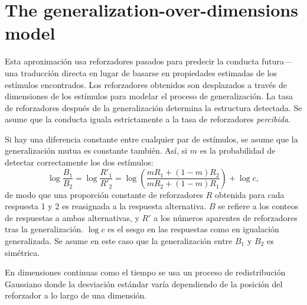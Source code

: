 \documentclass[a4paper,12pt]{article}
\begin{document}
\section{The generalization-over-dimensions model}

Esta aproximación usa reforzadores pasados para predecir la conducta futura---una traducción directa en lugar de basarse en propiedades estimadas de los estímulos encontrados. Los reforzadores obtenidos son desplazados a través de dimensiones de los estímulos para modelar el proceso de generalización. La tasa de reforzadores después de la generalización determina la estructura detectada. Se asume que la conducta iguala estrictamente a la tasa de reforzadores {\itshape percibida}.

\vspace{2mm}
{\centering{}}
\vspace{2mm}

Si hay una diferencia constante entre cualquier par de estímulos, se asume que la generalización mutua es constante también. Así, si $m$ es la probabilidad de detectar correctamente los dos estímulos:
\[
    \log\frac{B_1}{B_2} = \log\frac{R'_1}{R'_2} = \log \left(\frac{
            mR_1 + (1 - m) R_2
        }{
            mR_2 + (1 - m) R_1
    }\right) + \log c
,\]
de modo que una proporción constante de reforzadores $R$ obtenida para cada respuesta 1 y 2 es reasignada a la respuesta alternativa. $B$ se refiere a los conteos de respuestas a ambas alternativas, y $R'$ a los números aparentes de reforzadores tras la generalización. $\log c$ es el sesgo en las respuestas como en igualación generalizada. Se asume en este caso que la generalización entre $B_1$ y $B_2$ es simétrica.

En dimensiones continuas como el tiempo se usa un proceso de redistribución Gaussiano donde la desviación estándar varía dependiendo de la posición del reforzador a lo largo de una dimensión.
\end{document}
